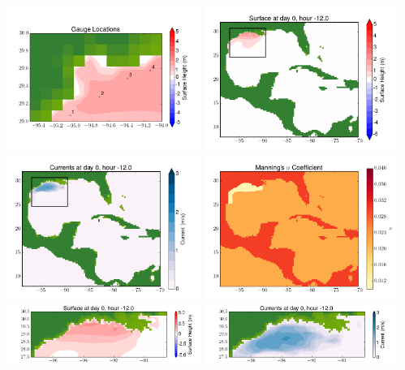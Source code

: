 \documentclass[11pt]{article}
\begin{document}
\includegraphics[width=0.475\textwidth]{frame0059fig10.png}
\vskip 10pt 
\includegraphics[width=0.475\textwidth]{frame0060fig1.png}
\includegraphics[width=0.475\textwidth]{frame0060fig2.png}
\vskip 10pt 
\includegraphics[width=0.475\textwidth]{frame0060fig3.png}
\includegraphics[width=0.475\textwidth]{frame0060fig4.png}
\vskip 10pt 
\includegraphics[width=0.475\textwidth]{frame0060fig5.png}
\end{document}
